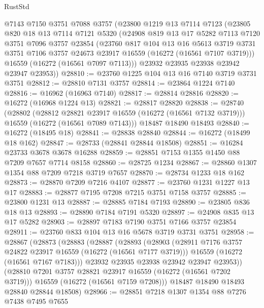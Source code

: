 \begin{lexlean}{RustStd}
\begin{coremodule}
    @7143
    @7150
    @3751
    @7088
    @3757
    (@23800
      @1219
      @13
      @7114
      @7123
      (@23805
        @820
        @18
        @13
        @7114
        @7121
        @5320
        (@24908
          @819
          @13
          @17
          @5282
          @7113
          @7120
          @3751
          @7096
          @3757
          @23854
          (@23760
            @817
            @104
            @13
            @16
            @5613
            @3719
            @3731
            @3751
            @7106
            @3757
            @24673
            @23917
            @16559
            (@16272 (@16561 @7107 @3719)))
          @16559
          (@16272 (@16561 @7097 @7113)))
        @23932
        @23935
        @23938
        @23942
        @23947
        @23953))
@28810 := @23760 @1225 @104 @13 @16 @7140 @3719 @3731 @3751
@28812 := @28810 @7131 @3757
@28814 := @23864 @1224 @7140
@28816 := @16962 (@16963 @7140)
@28817 := @28814 @28816
@28820 := @16272 (@16968 @1224 @13)
@28821 := @28817 @28820
@28838 := @28740
    (@28802
      (@28812 @28821 @23917 @16559 (@16272 (@16561 @7132 @3719)))
      @16559
      (@16272 (@16561 @7089 @7143)))
    @18487
    @18490
    @18493
@28840 := @16272 (@18495 @18)
@28841 := @28838 @28840
@28844 := @16272 (@18499 @18 @162)
@28847 := @28733 (@28841 @28844 @18508)
@28851 := @16284 @23733 @3678 @3678 @16288
@28859 := @28851 @7153 @1355 @1450 @88 @7209 @7657 @7714 @8158
@28860 := @28725 @1234
@28867 := @28860 @1307 @1354 @88 @7209 @7218 @3719 @7657
@28870 := @28734 @1233 @18 @162
@28873 := @28870 @7209 @7216 @4107
@28877 := @23760 @1231 @1227 @13 @17
@28883 := @28877 @7195 @7208 @7215 @3751 @7158 @3757
@28885 := @23800 @1231 @13
@28887 := @28885 @7184 @7193
@28890 := @23805 @836 @18 @13
@28893 := @28890 @7184 @7191 @5320
@28897 := @24908 @835 @13 @17 @5282
@28903 := @28897 @7183 @7190 @3751 @7166 @3757 @23854
@28911 := @23760 @833 @104 @13 @16 @5678 @3719 @3731 @3751
@28958 := @28867
    (@28873
      (@28883
        (@28887
          (@28893
            (@28903
              (@28911 @7176 @3757 @24822 @23917 @16559 (@16272 (@16561 @7177 @3719)))
              @16559
              (@16272 (@16561 @7167 @7183)))
            @23932
            @23935
            @23938
            @23942
            @23947
            @23953))
        (@28810 @7201 @3757 @28821 @23917 @16559 (@16272 (@16561 @7202 @3719)))
        @16559
        (@16272 (@16561 @7159 @7208)))
      @18487
      @18490
      @18493
      @28840
      @28844
      @18508)
@28966 := @28851 @7218 @1307 @1354 @88 @7276 @7438 @7495 @7655

\end{coremodule}
\end{lexlean}

